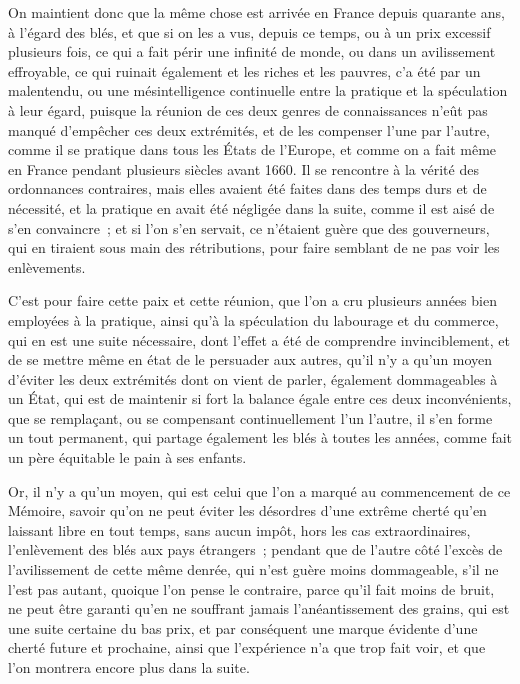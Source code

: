 \documentclass[french,twoside]{book} %
\begin{document}
On maintient donc que la même chose est arrivée en France depuis quarante ans, à l’égard des blés, et que si on les a vus, depuis ce temps, ou à un prix excessif plusieurs fois, ce qui a fait périr une infinité de monde, ou dans un avilissement effroyable, ce qui ruinait également et les riches et les pauvres, c’a été par un malentendu, ou une mésintelligence continuelle entre la pratique et la spéculation à leur égard, puisque la réunion de ces deux genres de connaissances n’eût pas manqué d’empêcher ces deux extrémités, et de les compenser l’une par l’autre, comme il se pratique dans tous les États de l’Europe, et comme on a fait même en France pendant plusieurs siècles avant 1660. Il se rencontre à la vérité des ordonnances contraires, mais elles avaient été faites dans des temps durs et de nécessité, et la pratique en avait été négligée dans la suite, comme il est aisé de s’en convaincre ; et si l’on s’en servait, ce n’étaient guère que des gouverneurs, qui en tiraient sous main des rétributions, pour faire semblant de ne pas voir les enlèvements.\par
C’est pour faire cette paix et cette réunion, que l’on a cru plusieurs années bien employées à la pratique, ainsi qu’à la spéculation du labourage et du commerce, qui en est une suite nécessaire, dont l’effet a été de comprendre invinciblement, et de se mettre même en état de le persuader aux autres, qu’il n’y a qu’un moyen d’éviter les deux extrémités dont on vient de parler, également dommageables à un État, qui est de maintenir si fort la balance égale entre ces deux inconvénients, que se remplaçant, ou se compensant continuellement l’un l’autre, il s’en forme un tout permanent, qui partage également les blés à toutes les années, comme fait un père équitable le pain à ses enfants.\par
Or, il n’y a qu’un moyen, qui est celui que l’on a marqué au commencement de ce Mémoire, savoir qu’on ne peut éviter les désordres d’une extrême cherté qu’en laissant libre en tout temps, sans aucun impôt, hors les cas extraordinaires, l’enlèvement des blés aux pays étrangers ; pendant que de l’autre côté l’excès de l’avilissement de cette même denrée, qui n’est guère moins dommageable, s’il ne l’est pas autant, quoique l’on pense le contraire, parce qu’il fait moins de bruit, ne peut être garanti qu’en ne souffrant jamais l’anéantissement des grains, qui est une suite certaine du bas prix, et par conséquent une marque évidente d’une cherté future et prochaine, ainsi que l’expérience n’a que trop fait voir, et que l’on montrera encore plus dans la suite.\par
\end{document}
